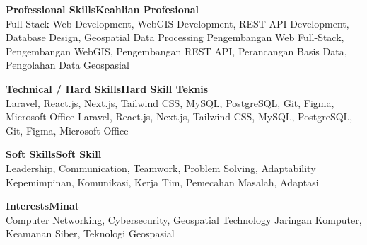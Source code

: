 

\textbf{\ifenglish Professional Skills\else Keahlian Profesional\fi} \\
\ifenglish
Full-Stack Web Development, WebGIS Development, REST API Development, Database Design, Geospatial Data Processing
\else
Pengembangan Web Full-Stack, Pengembangan WebGIS, Pengembangan REST API, Perancangan Basis Data, Pengolahan Data Geospasial
\fi

\vspace{4pt}

\textbf{\ifenglish Technical / Hard Skills\else Hard Skill Teknis\fi} \\
\ifenglish
Laravel, React.js, Next.js, Tailwind CSS, MySQL, PostgreSQL, Git, Figma, Microsoft Office
\else
Laravel, React.js, Next.js, Tailwind CSS, MySQL, PostgreSQL, Git, Figma, Microsoft Office
\fi

\vspace{4pt}

\textbf{\ifenglish Soft Skills\else Soft Skill\fi} \\
\ifenglish
Leadership, Communication, Teamwork, Problem Solving, Adaptability
\else
Kepemimpinan, Komunikasi, Kerja Tim, Pemecahan Masalah, Adaptasi
\fi

\vspace{4pt}

\textbf{\ifenglish Interests\else Minat\fi} \\
\ifenglish
Computer Networking, Cybersecurity, Geospatial Technology
\else
Jaringan Komputer, Keamanan Siber, Teknologi Geospasial
\fi